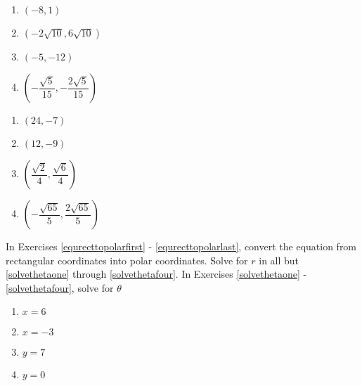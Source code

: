 \documentclass{ximera}
\begin{document}
\begin{multicols}{4} 

\begin{enumerate}

\setcounter{enumi}{\value{HW}}

\item $(-8,1)$ 
\item $(-2\sqrt{10}, 6\sqrt{10})$ 
\item $\left(-5, -12 \right)$ 
\item $\left(-\dfrac{\sqrt{5}}{15}, -\dfrac{2\sqrt{5}}{15}  \right)$

\setcounter{HW}{\value{enumi}}

\end{enumerate}

\end{multicols}

\begin{multicols}{4} 

\begin{enumerate}

\setcounter{enumi}{\value{HW}}

\item  $\left(24, -7 \right)$ 
\item $\left(12, -9\right)$ 
\item $\left(\dfrac{\sqrt{2}}{4}, \dfrac{\sqrt{6}}{4}\right)$
\item  $\left(-\dfrac{\sqrt{65}}{5}, \dfrac{2\sqrt{65}}{5}\right)$ \label{recttopolarlast}

\setcounter{HW}{\value{enumi}}

\end{enumerate}

\end{multicols}

In Exercises \ref{equrecttopolarfirst} - \ref{equrecttopolarlast}, convert the equation from rectangular coordinates into polar coordinates.  Solve for $r$ in all but \ref{solvethetaone} through \ref{solvethetafour}.  In Exercises \ref{solvethetaone} - \ref{solvethetafour},  solve for $\theta$

\begin{multicols}{4}

\begin{enumerate}

\setcounter{enumi}{\value{HW}}

\item $x = 6$ \label{equrecttopolarfirst}
\item $x = -3$
\item $y = 7$
\item $y = 0$ \label{solvethetaone} 

\setcounter{HW}{\value{enumi}}

\end{enumerate}

\end{multicols}
\end{document}

